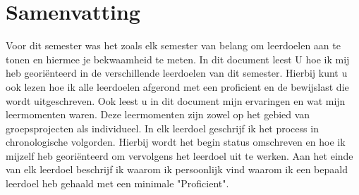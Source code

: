 \chapter*{Samenvatting}
\label{ch:summary}

Voor dit semester was het zoals elk semester van belang om leerdoelen aan te tonen en hiermee je bekwaamheid te meten.
In dit document leest U hoe ik mij heb georiënteerd in de verschillende leerdoelen van dit semester.
Hierbij kunt u ook lezen hoe ik alle leerdoelen afgerond met een proficient en de bewijslast die wordt uitgeschreven.
Ook leest u in dit document mijn ervaringen en wat mijn leermomenten waren.
Deze leermomenten zijn zowel op het gebied van groepsprojecten als individueel.
In elk leerdoel geschrijf ik het process in chronologische volgorden.
Hierbij wordt het begin status omschreven en hoe ik mijzelf heb georiënteerd om vervolgens het leerdoel uit te werken.
Aan het einde van elk leerdoel beschrijf ik waarom ik persoonlijk vind waarom ik een bepaald leerdoel heb gehaald met een minimale "Proficient".

